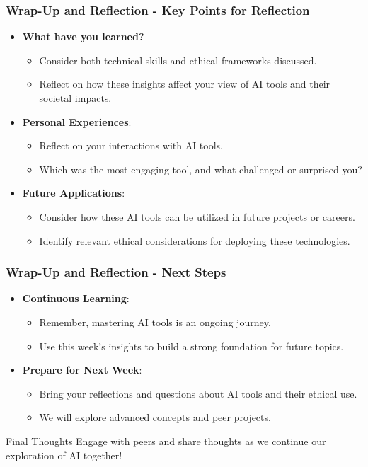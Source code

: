 \documentclass[aspectratio=169]{beamer}
\begin{document}
\begin{frame}[fragile]
    \frametitle{Wrap-Up and Reflection - Key Points for Reflection}
    \begin{itemize}
        \item \textbf{What have you learned?} 
        \begin{itemize}
            \item Consider both technical skills and ethical frameworks discussed. 
            \item Reflect on how these insights affect your view of AI tools and their societal impacts.
        \end{itemize}
        \item \textbf{Personal Experiences}:
        \begin{itemize}
            \item Reflect on your interactions with AI tools. 
            \item Which was the most engaging tool, and what challenged or surprised you?
        \end{itemize}
        \item \textbf{Future Applications}:
        \begin{itemize}
            \item Consider how these AI tools can be utilized in future projects or careers.
            \item Identify relevant ethical considerations for deploying these technologies.
        \end{itemize}
    \end{itemize}
\end{frame}

\begin{frame}[fragile]
    \frametitle{Wrap-Up and Reflection - Next Steps}
    \begin{itemize}
        \item \textbf{Continuous Learning}:
        \begin{itemize}
            \item Remember, mastering AI tools is an ongoing journey.
            \item Use this week’s insights to build a strong foundation for future topics.
        \end{itemize}
        \item \textbf{Prepare for Next Week}:
        \begin{itemize}
            \item Bring your reflections and questions about AI tools and their ethical use.
            \item We will explore advanced concepts and peer projects.
        \end{itemize}
    \end{itemize}
    \begin{block}{Final Thoughts}
        Engage with peers and share thoughts as we continue our exploration of AI together!
    \end{block}
\end{frame}
\end{document}
